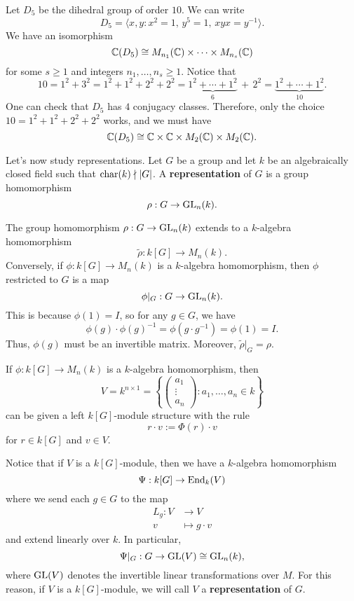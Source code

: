 \begin{exmp}
    Let $D_5$ be the dihedral group of order $10$. We can write 
    \[ D_5 = \langle x, y : x^2 = 1,\, y^5 = 1,\, xyx = y^{-1} \rangle. \] 
    We have an isomorphism 
    \[ \mathbb{C}(D_5) \cong M_{n_1}(\mathbb{C}) \times \cdots \times M_{n_s}(\mathbb{C}) \] 
    for some $s \geq 1$ and integers $n_1, \dots, n_s \geq 1$. 
    Notice that 
    \[ 10 = 1^2 + 3^2 = 1^2 + 1^2 + 2^2 + 2^2 = \underbrace{1^2 + \cdots + 1^2}_{6} \,+\, 2^2 
    = \underbrace{1^2 + \cdots + 1^2}_{10}. \] 
    One can check that $D_5$ has $4$ conjugacy classes. Therefore, only the 
    choice $10 = 1^2 + 1^2 + 2^2 + 2^2$ works, and we must have 
    \[ \mathbb{C}(D_5) \cong \mathbb{C} \times \mathbb{C} \times M_2(\mathbb{C}) \times M_2(\mathbb{C}). \] 
\end{exmp}

Let's now study representations. Let $G$ be a group and 
let $k$ be an algebraically closed field such that $\operatorname{char}(k) \nmid |G|$. 
A {\bf representation} of $G$ is a group homomorphism 
\[ \rho : G \to \operatorname{GL}_n(k). \]

\begin{remark}
    The group homomorphism $\rho : G \to \operatorname{GL}_n(k)$ extends to a $k$-algebra 
    homomorphism 
    \[ \tilde\rho : k[G] \to M_n(k). \] 
    Conversely, if $\phi : k[G] \to M_n(k)$ is a $k$-algebra homomorphism, then
    $\phi$ restricted to $G$ is a map  
    \[ \phi|_G : G \to \operatorname{GL}_n(k). \] 
    This is because $\phi(1) = I$, so for any $g \in G$, we have 
    \[ \phi(g) \cdot \phi(g)^{-1} = \phi(g \cdot g^{-1}) = \phi(1) = I. \] 
    Thus, $\phi(g)$ must be an invertible matrix. Moreover, $\tilde\rho|_G 
    = \rho$. 
\end{remark}

\begin{remark}
    If $\phi : k[G] \to M_n(k)$ is a $k$-algebra homomorphism, then 
    \[ V = k^{n\times 1} = \left\{ \begin{pmatrix} a_1 \\ \vdots \\ a_n
    \end{pmatrix} : a_1, \dots, a_n \in k \right\} \] 
    can be given a left $k[G]$-module structure with the rule 
    \[ r \cdot v := \Phi(r) \cdot v \] 
    for $r \in k[G]$ and $v \in V$. 
\end{remark} 

Notice that if $V$ is a $k[G]$-module, then we have a $k$-algebra homomorphism
\[ \Psi : k[G] \to \operatorname{End}_k(V) \] 
where we send each $g \in G$ to the map 
\begin{align*} L_g : V &\to V \\ v &\mapsto g\cdot v \end{align*}
and extend linearly over $k$. In particular, 
\[ \Psi|_G : G \to \operatorname{GL}(V) \cong \operatorname{GL}_n(k), \] 
where $\operatorname{GL}(V)$ denotes the invertible linear transformations over $M$. 
For this reason, if $V$ is a $k[G]$-module, we will call $V$ a 
{\bf representation} of $G$. 


